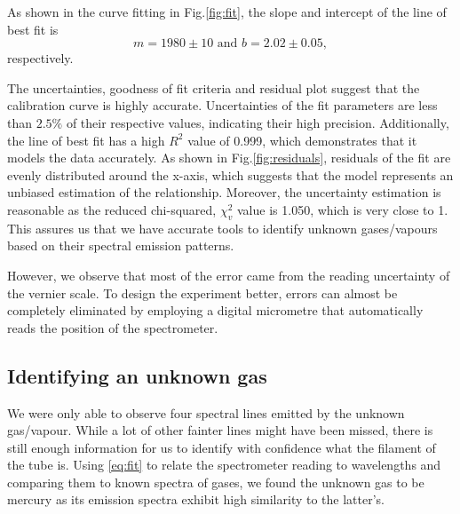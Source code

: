\documentclass[12pt]{article}
\begin{document}
As shown in the curve fitting in Fig.\ref{fig:fit}, the slope and intercept of the line of best fit is 
\begin{equation*}
    m=1980 \pm 10\text{ and }b=2.02 \pm 0.05,
\end{equation*}
respectively.

The uncertainties, goodness of fit criteria and residual plot suggest that the calibration curve is highly accurate. Uncertainties of the fit parameters are less than $2.5\%$ of their respective values, indicating their high precision. Additionally, the line of best fit has a high $R^2$ value of 0.999, which demonstrates that it models the data accurately. As shown in Fig.\ref{fig:residuals}, residuals of the fit are evenly distributed around the x-axis, which suggests that the model represents an unbiased estimation of the relationship. Moreover, the uncertainty estimation is reasonable as the reduced chi-squared, $\chi_v^2$ value is 1.050, which is very close to 1. This assures us that we have accurate tools to identify unknown gases/vapours based on their spectral emission patterns.

However, we observe that most of the error came from the reading uncertainty of the vernier scale. To design the experiment better, errors can almost be completely eliminated by employing a digital micrometre that automatically reads the position of the spectrometer.


\subsection{Identifying an unknown gas}
We were only able to observe four spectral lines emitted by the unknown gas/vapour. While a lot of other fainter lines might have been missed, there is still enough information for us to identify with confidence what the filament of the tube is. Using \eqref{eq:fit} to relate the spectrometer reading to wavelengths and comparing them to known spectra of gases, we found the unknown gas to be mercury as its emission spectra exhibit high similarity to the latter's.
\end{document}
